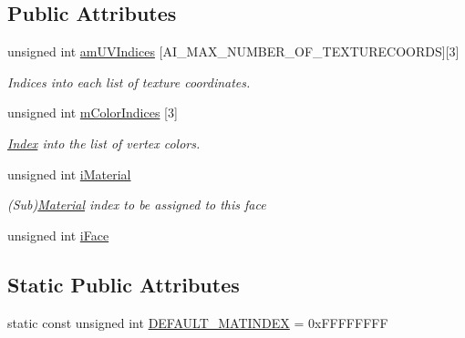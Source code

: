 \subsection*{Public Attributes}
\begin{DoxyCompactItemize}
\item 
\hypertarget{struct_assimp_1_1_a_s_e_1_1_face_a567c06589bad0c51dd36998d28cdfd3c}{unsigned int \hyperlink{struct_assimp_1_1_a_s_e_1_1_face_a567c06589bad0c51dd36998d28cdfd3c}{am\+U\+V\+Indices} \mbox{[}A\+I\+\_\+\+M\+A\+X\+\_\+\+N\+U\+M\+B\+E\+R\+\_\+\+O\+F\+\_\+\+T\+E\+X\+T\+U\+R\+E\+C\+O\+O\+R\+D\+S\mbox{]}\mbox{[}3\mbox{]}}\label{struct_assimp_1_1_a_s_e_1_1_face_a567c06589bad0c51dd36998d28cdfd3c}

\begin{DoxyCompactList}\small\item\em Indices into each list of texture coordinates. \end{DoxyCompactList}\item 
\hypertarget{struct_assimp_1_1_a_s_e_1_1_face_ae120f12e3a6dada28701c69c81b0f671}{unsigned int \hyperlink{struct_assimp_1_1_a_s_e_1_1_face_ae120f12e3a6dada28701c69c81b0f671}{m\+Color\+Indices} \mbox{[}3\mbox{]}}\label{struct_assimp_1_1_a_s_e_1_1_face_ae120f12e3a6dada28701c69c81b0f671}

\begin{DoxyCompactList}\small\item\em \hyperlink{struct_index}{Index} into the list of vertex colors. \end{DoxyCompactList}\item 
\hypertarget{struct_assimp_1_1_a_s_e_1_1_face_a700791573ec441c5ecf6170a60c6c735}{unsigned int \hyperlink{struct_assimp_1_1_a_s_e_1_1_face_a700791573ec441c5ecf6170a60c6c735}{i\+Material}}\label{struct_assimp_1_1_a_s_e_1_1_face_a700791573ec441c5ecf6170a60c6c735}

\begin{DoxyCompactList}\small\item\em (Sub)\hyperlink{struct_assimp_1_1_a_s_e_1_1_material}{Material} index to be assigned to this face \end{DoxyCompactList}\item 
unsigned int \hyperlink{struct_assimp_1_1_a_s_e_1_1_face_adbcb29737e7cad53d0681baf04230491}{i\+Face}
\end{DoxyCompactItemize}
\subsection*{Static Public Attributes}
\begin{DoxyCompactItemize}
\item 
static const unsigned int \hyperlink{struct_assimp_1_1_a_s_e_1_1_face_ab6f79b5a2df7c665ec7d56a258f8391f}{D\+E\+F\+A\+U\+L\+T\+\_\+\+M\+A\+T\+I\+N\+D\+E\+X} = 0x\+F\+F\+F\+F\+F\+F\+F\+F
\end{DoxyCompactItemize}


